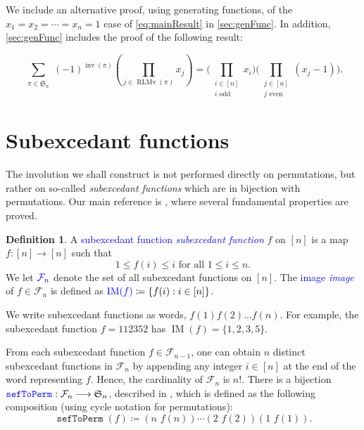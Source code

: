\documentclass[reqno]{amsart}
\theoremstyle{definition}
\newtheorem{definition}[theorem]{Definition}
\newcommand{\defin}[1]{%
\relax\ifmmode%
\textcolor{blue}{#1}%
\else\textcolor{blue}{\emph{#1}}%
\fi%
}
\newcommand{\symS}{\mathfrak{S}}
\newcommand{\SEF}{\mathcal{F}}  %
\DeclareMathOperator{\inv}{inv}
\DeclareMathOperator{\RLMv}{RLMv}
\DeclareMathOperator{\supp}{IM}
\DeclareMathOperator{\sefToPerm}{\mathtt{sefToPerm}}
\begin{document}
We include an alternative proof, using generating functions, of the $x_1=x_2=\dotsb = x_n=1$
case of \eqref{eq:mainResult}
in \cref{sec:genFunc}. In addition, \cref{sec:genFunc} includes the proof of the following result:

\begin{equation*}\label{eq:rlminSumIntro}
 \sum_{\substack{\pi \in \symS_n   }} (-1)^{\inv(\pi)} 
 \left(\prod_{j \in \RLMv(\pi)} x_j \right)
 = 
	\big(\prod_{\substack{i \in [n] \\ i \text{ odd}}} x_i\big)
	\big(\prod_{\substack{j \in [n] \\ j \text{ even}}} (x_j-1)\big).
\end{equation*}



\section{Subexcedant functions}

The involution we shall construct is not performed directly on permutations,
but rather on so-called \emph{subexcedant functions} which are in bijection with permutations.
Our main reference is \cite{MantaciRakotondrajao2001},
where several fundamental properties are proved.
%
\begin{definition}\label{subex}
	A \defin{subexcedant function}  $f$ on $[n]$ is a map $f : [n] \longrightarrow [n]$
	such that
	\begin{equation*}
		1\leq f(i)\leq i \text{ for all } 1\leq i\leq n.
	\end{equation*}
	We let $\defin{\SEF_n}$ denote the set of all 
	subexcedant functions on $[n]$. 
	The \defin{image} of $f \in \SEF_n$ is defined as
	$\defin{\supp(f)} \coloneqq \{ f(i) : i \in [n] \}$.
\end{definition}
We write subexcedant functions as words, $f(1)f(2)\dotsc f(n)$.
For example, the subexcedant function $f=112352$ has $\supp(f)=\{1,2,3,5\}$.

From each subexcedant function $f \in \SEF_{n-1}$,
one can obtain $n$ distinct subexcedant functions in $\SEF_{n}$ by appending
any integer $i\in [n]$ at the end of the word representing $f$.
Hence, the cardinality of $\mathcal{F}_n$ is $n!$.
There is a bijection $\defin{\sefToPerm}: \SEF_n \longrightarrow \symS_n$,
described in \cite{MantaciRakotondrajao2001}, 
which is defined as the following composition (using cycle notation for permutations):
\begin{equation*}\label{eq:sefToPerm}
  \sefToPerm(f) \coloneqq (n\,\,f(n))  \dotsm (2\,\,f(2)) (1\,\,f(1)).
\end{equation*}
\end{document}
